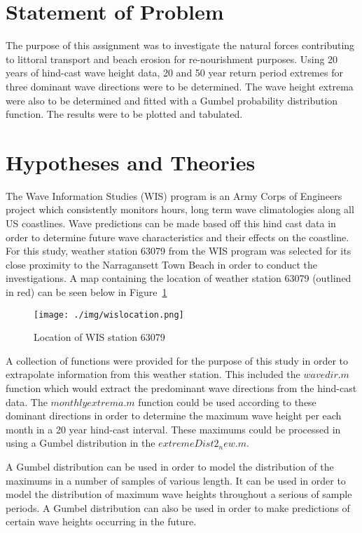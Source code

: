 \section{Statement of Problem}

The purpose of this assignment was to investigate the natural forces contributing to littoral transport and beach erosion for re-nourishment purposes. Using 20 years of hind-cast wave height data, 20 and 50 year return period extremes for three dominant wave directions were to be determined. The wave height extrema were also to be determined and fitted with a Gumbel probability distribution function. The results were to be plotted and tabulated.

\section{Hypotheses and Theories}

The Wave Information Studies (WIS) program is an Army Corps of Engineers project which consistently monitors hours, long term wave climatologies along all US coastlines. Wave predictions can be made based off this hind cast data in order to determine future wave characteristics and their effects on the coastline. For this study, weather station 63079 from the WIS program was selected for its close proximity to the Narragansett Town Beach in order to conduct the investigations. A map containing the location of weather station 63079 (outlined in red) can be seen below in Figure~\ref{fig:wis1}

\begin{figure}[H]
	\centering
	\texttt{[image: ./img/wislocation.png]}
	\label{fig:wis1}
	\caption{Location of WIS station 63079}
\end{figure}

A collection of functions were provided for the purpose of this study in order to extrapolate information from this weather station. This included the $wavedir.m$ function which would extract the predominant wave directions from the hind-cast data. The $monthlyextrema.m$ function could be used according to these dominant directions in order to determine the maximum wave height per each month in a 20 year hind-cast interval. These maximums could be processed in using a Gumbel distribution in the $extremeDist2_new.m$.

A Gumbel distribution can be used in order to model the distribution of the maximums in a number of samples of various length. It can be used in order to model the distribution of maximum wave heights throughout a serious of sample periods. A Gumbel distribution can also be used in order to make predictions of certain wave heights occurring in the future.  

